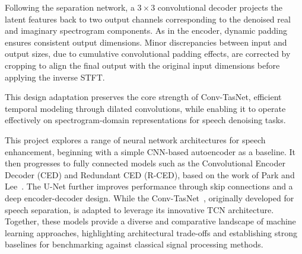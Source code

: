 Following the separation network, a \(3 \times 3\) convolutional decoder projects the latent features back to two output channels corresponding to the denoised real and imaginary spectrogram components. As in the encoder, dynamic padding ensures consistent output dimensions. Minor discrepancies between input and output sizes, due to cumulative convolutional padding effects, are corrected by cropping to align the final output with the original input dimensions before applying the inverse STFT.

This design adaptation preserves the core strength of Conv-TasNet, efficient temporal modeling through dilated convolutions, while enabling it to operate effectively on spectrogram-domain representations for speech denoising tasks.

\vspace{2em}

This project explores a range of neural network architectures for speech enhancement, beginning with a simple CNN-based autoencoder as a baseline. It then progresses to fully connected models such as the Convolutional Encoder Decoder (CED) and Redundant CED (R-CED), based on the work of Park and Lee~\cite{park2017acoustic}. The U-Net further improves performance through skip connections and a deep encoder-decoder design. While the Conv-TasNet~\cite{luo2019conv}, originally developed for speech separation, is adapted to leverage its innovative TCN architecture. Together, these models provide a diverse and comparative landscape of machine learning approaches, highlighting architectural trade-offs and establishing strong baselines for benchmarking against classical signal processing methods.



